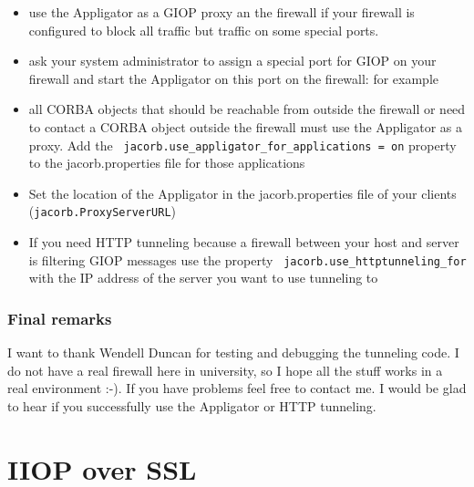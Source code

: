 \documentclass[12pt]{scrbook}
\begin{document}
\begin{itemize}
\item  use the  Appligator as  a GIOP  proxy an  the firewall  if your
firewall  is configured  to  block  all traffic  but  traffic on  some
special ports.

\item ask your system administrator  to assign a special port for GIOP
on  your  firewall  and start  the  Appligator  on  this port  on  the
firewall: for example


\item  all CORBA  objects that  should be  reachable from  outside the
firewall or need  to contact a CORBA object  outside the firewall must
use    the     Appligator    as     a    proxy.    Add     the    {\tt
jacorb.use\_appligator\_for\_applications   =  on}  property   to  the
jacorb.properties file for those applications

\item Set the location of the Appligator in the jacorb.properties file
of your clients ({\tt jacorb.ProxyServerURL})

\item If you need HTTP  tunneling because a firewall between your host
and  server   is  filtering  GIOP  messages  use   the  property  {\tt
jacorb.use\_httptunneling\_for} with the IP  address of the server you
want to use tunneling to

\end{itemize}


\subsection*{Final remarks}

I want to thank Wendell Duncan for testing and debugging the tunneling
code.  I do not have a real firewall here in university, so I hope all
the stuff works  in a real environment :-). If  you have problems feel
free to contact  me.  I would be glad to hear  if you successfully use
the Appligator or HTTP tunneling.



\chapter{IIOP over SSL}

\label{SSL}
\end{document}

